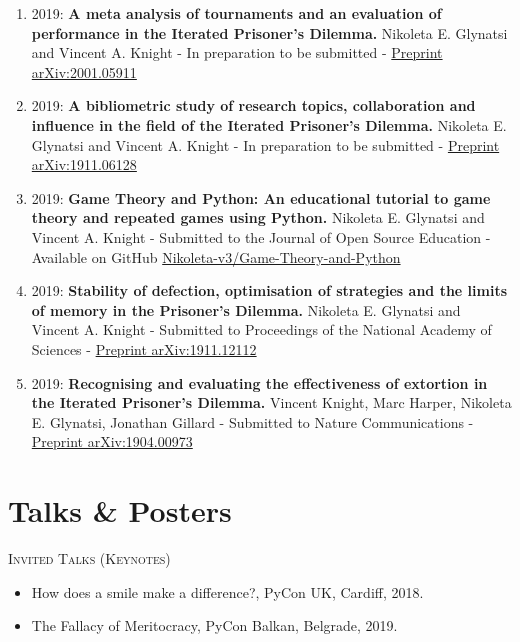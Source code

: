 \begin{enumerate}
	\def\labelenumi{\arabic{enumi}.}
\item 2019: \textbf{A meta analysis of tournaments and an evaluation of
performance in the Iterated Prisoner’s Dilemma.} Nikoleta E. Glynatsi and Vincent A. Knight -
In preparation to be submitted - \href{https://arxiv.org/abs/2001.05911}{Preprint arXiv:2001.05911}
\item 2019: \textbf{A bibliometric study of research topics, collaboration and influence in the field of the Iterated Prisoner's Dilemma.}
Nikoleta E. Glynatsi and Vincent A. Knight -
In preparation to be submitted - \href{https://arxiv.org/abs/1911.12112}{Preprint arXiv:1911.06128}
\item 2019: \textbf{Game Theory and Python: An educational tutorial to game
theory and repeated games using Python.} Nikoleta E. Glynatsi and Vincent A. Knight -
Submitted to the Journal of Open Source Education - Available on GitHub
\href{https://github.com/Nikoleta-v3/Game-Theory-and-Python}{Nikoleta-v3/Game-Theory-and-Python}
\item 2019: \textbf{Stability of defection, optimisation of strategies and the
limits of memory in the Prisoner's Dilemma.} Nikoleta E. Glynatsi and Vincent A. Knight -
Submitted to Proceedings of the National Academy of Sciences -
\href{https://arxiv.org/abs/1911.12112}{Preprint arXiv:1911.12112}
\item 2019: \textbf{Recognising and evaluating the effectiveness of extortion in
the Iterated Prisoner's Dilemma.} Vincent Knight, Marc Harper, Nikoleta E. Glynatsi,
Jonathan Gillard -
Submitted to Nature Communications -
\href{https://arxiv.org/abs/1904.00973}{Preprint arXiv:1904.00973}
\end{enumerate}

\section*{Talks \& Posters}

\textsc{Invited Talks (Keynotes)}
\begin{itemize}
	\item How does a smile make a difference?, PyCon UK, Cardiff, 2018.
	\item The Fallacy of Meritocracy, PyCon Balkan, Belgrade, 2019.
\end{itemize}

